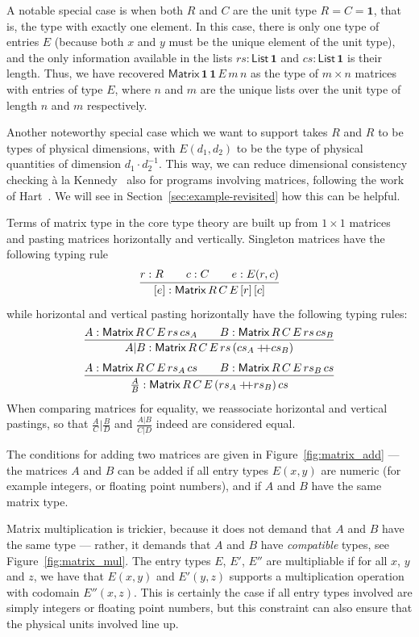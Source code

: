 \documentclass{IMEKO2024}
\newcommand{\isadd}[1]{#1\ \textsf{numeric}}
\newcommand{\ismult}[3]{(#1, #2, #3)\ \textsf{multipliable}}
\newcommand{\append}{+\!\!\!+}
\newcommand{\hjux}[2]{{#1}|{#2}}
\newcommand{\vjux}[2]{\frac{#1}{#2}}
\newcommand{\One}{\mathbf{1}}
\newcommand{\Matrix}[5]{\mathsf{Matrix}\,#1\,#2\,#3\,#4\,#5}
\newcommand{\List}[1]{\mathsf{List}\,#1}
\newcommand{\remph}{\emph}
\begin{document}
A notable special case is when both $R$ and $C$ are the unit type
$R = C = \One$, that is, the type with exactly one element.
%
In this case, there is only one type of entries $E$ (because both $x$
and $y$ must be the unique element of the unit type), and the only
information available in the lists $rs : \List{\One}$ and
$cs : \List{\One}$ is their length.
%
Thus, we have recovered $\Matrix{\One}{\One}{E}{m}{n}$ as the type of
$m \times n$ matrices with entries of type $E$, where $n$ and $m$ are
the unique lists over the unit type of length $n$ and $m$
respectively.

Another noteworthy special case which we want to support takes $R$ and
$R$ to be types of physical dimensions, with $E(d_1, d_2)$ to be the
type of physical quantities of dimension $d_1 \cdot d_2^{-1}$.
%
This way, we can reduce dimensional consistency checking \`a la
Kennedy~\cite{kennedyUOM} also for programs involving matrices,
following the work of Hart~\cite{hart}.
%
We will see in Section~\ref{sec:example-revisited} how this can be helpful.

Terms of matrix type in the core type theory are built up from
$1 \times 1$ matrices and pasting matrices horizontally and vertically.
%
Singleton matrices have the following typing rule
\[
  \infer{[e] : \Matrix{R}{C}{E}{[r]}{[c]}}
    {r : R
      &\quad
      c : C
      &\quad
      e : E(r, c)
    }
\]
%
while horizontal and vertical pasting horizontally have the following
typing rules:
\[
  \infer{\hjux{A}{B} : \Matrix{R}{C}{E}{rs}{(cs_A \append cs_B)}}
  {
    A : \Matrix{R}{C}{E}{rs}{cs_A}
    &\quad
    B : \Matrix{R}{C}{E}{rs}{cs_B}
  }
\]
\[
  \infer{\vjux{A}{B} : \Matrix{R}{C}{E}{(rs_A \append rs_B)}{cs}}
  {
    A : \Matrix{R}{C}{E}{rs_A}{cs}
    &\quad
    B : \Matrix{R}{C}{E}{rs_B}{cs}
  }
\]
When comparing matrices for equality, we reassociate horizontal and
vertical pastings, so that $\hjux{\vjux{A}{C}}{\vjux{B}{D}}$ and
$\vjux{\hjux{A}{B}}{\hjux{C}{D}}$ indeed are considered equal.

The conditions for adding two matrices are given in Figure~\ref{fig:matrix_add} --- the matrices $A$ and $B$ can be added if all entry types $E(x, y)$ are
numeric (for example integers, or floating point numbers), and if $A$
and $B$ have the same matrix type.
%
%

Matrix multiplication is trickier, because it does not demand that $A$
and $B$ have the same type --- rather, it demands that $A$ and $B$
have \remph{compatible} types, see Figure~\ref{fig:matrix_mul}.
%
The entry types $E$, $E'$, $E''$ are multipliable if for all $x$, $y$
and $z$, we have that $E(x, y)$ and $E'(y, z)$ supports a
multiplication operation with codomain $E''(x, z)$.
%
This is certainly the case if all entry types involved are simply
integers or floating point numbers, but this constraint can also
ensure that the physical units involved line up.
\end{document}
